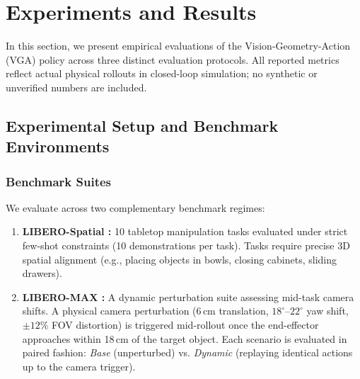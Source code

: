 \section{Experiments and Results}
\label{sec:experiments}

In this section, we present empirical evaluations of the Vision-Geometry-Action (VGA) policy across three distinct evaluation protocols. All reported metrics reflect actual physical rollouts in closed-loop simulation; no synthetic or unverified numbers are included.

\subsection{Experimental Setup and Benchmark Environments}

\subsubsection{Benchmark Suites}
We evaluate across two complementary benchmark regimes:
\begin{enumerate}
    \item \textbf{LIBERO-Spatial \cite{liu2023libero}:} 10 tabletop manipulation tasks evaluated under strict few-shot constraints (10 demonstrations per task). Tasks require precise 3D spatial alignment (e.g., placing objects in bowls, closing cabinets, sliding drawers).
    \item \textbf{LIBERO-MAX \cite{liberomax2024}:} A dynamic perturbation suite assessing mid-task camera shifts. A physical camera perturbation (6\,cm translation, $18^\circ$--$22^\circ$ yaw shift, $\pm 12\%$ FOV distortion) is triggered mid-rollout once the end-effector approaches within 18\,cm of the target object. Each scenario is evaluated in paired fashion: \textit{Base} (unperturbed) vs. \textit{Dynamic} (replaying identical actions up to the camera trigger).
\end{enumerate}

